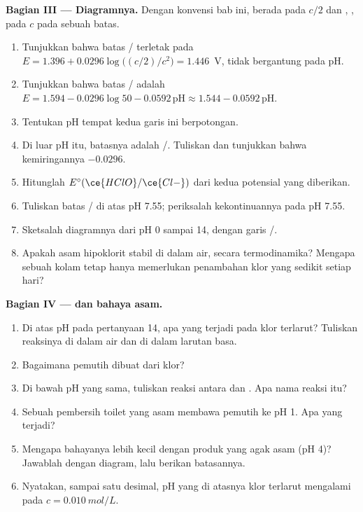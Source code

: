 \begin{problem}
\medskip
\noindent\textbf{Bagian III --- Diagramnya.}
Dengan konvensi bab ini,  berada pada $c/2$ dan ,
,  pada $c$ pada sebuah batas.
\begin{enumerate}[resume]
  \item Tunjukkan bahwa batas / terletak pada $E = 1.396 +
        0.0296\log\bigl((c/2)/c^2\bigr) = 1.446$~V, tidak bergantung pada
        pH.
  \item Tunjukkan bahwa batas / adalah $E = 1.594 -
        0.0296\log 50 - 0.0592\,\mathrm{pH} \approx 1.544 -
        0.0592\,\mathrm{pH}$.
  \item Tentukan pH tempat kedua garis ini berpotongan.
  \item Di luar pH itu, batasnya adalah /. Tuliskan
         dan tunjukkan bahwa kemiringannya $-0.0296$.
  \item Hitunglah $E^\circ(\ce{HClO}/\ce{Cl-})$ dari kedua potensial yang
        diberikan.
  \item Tuliskan batas / di atas pH 7.55; periksalah
        kekontinuannya pada pH 7.55.
  \item Sketsalah diagramnya dari pH 0 sampai 14, dengan garis
        /.
  \item Apakah asam hipoklorit stabil di dalam air, secara termodinamika?
        Mengapa sebuah kolam tetap hanya memerlukan penambahan klor yang
        sedikit setiap hari?
\end{enumerate}

\medskip
\noindent\textbf{Bagian IV ---  dan bahaya asam.}
\begin{enumerate}[resume]
  \item Di atas pH pada pertanyaan 14, apa yang terjadi pada klor
        terlarut? Tuliskan reaksinya di dalam air dan di dalam larutan
        basa.
  \item Bagaimana pemutih dibuat dari klor?
  \item Di bawah pH yang sama, tuliskan reaksi antara  dan
        . Apa nama reaksi itu?
  \item Sebuah pembersih toilet yang asam membawa pemutih ke pH 1. Apa
        yang terjadi?
  \item Mengapa bahayanya lebih kecil dengan produk yang agak asam
        (pH 4)? Jawablah dengan diagram, lalu berikan batasannya.
  \item Nyatakan, sampai satu desimal, pH yang di atasnya klor terlarut
        mengalami  pada $c = \qty{0.010}{mol/L}$.
\end{enumerate}
\end{problem}
